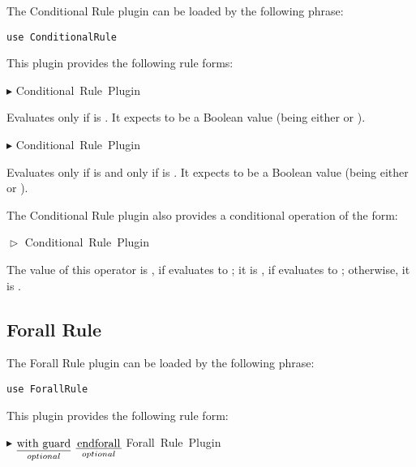 \documentclass{article}
\newcommand{\ruleform}[2]{\pform{$\blacktriangleright$}{#1}{#2}}
\newcommand{\opform}[2]{\pform{$\vartriangleright$}{#1}{#2}}
\newcommand{\pform}[3]{\vspace*{4mm} \noindent #1 #2 \vspace{1mm}\textcolor[gray]{0.7}{\dotfill}\mbox{{\sffamily \footnotesize #3}}}
\newcommand{\optional}[1]{$\underset{optional}{\underline{\mbox{#1}}}$}
\begin{document}
The Conditional Rule plugin can be loaded by the following  phrase:

\begin{lstlisting}
use ConditionalRule
\end{lstlisting}

\noindent This plugin provides the following rule forms:

\ruleform{
	}{Conditional Rule Plugin}

Evaluates  only if  is . It expects  to be a Boolean value (being either  or ).

\ruleform{
	}{Conditional Rule Plugin}

Evaluates  only if  is  and  only if  is . It expects  to be a Boolean value (being either  or ).

The Conditional Rule plugin also provides a conditional operation of the form:

\opform{
	}{Conditional Rule Plugin}

The value of this operator is , if  evaluates to ; it is ,
if  evaluates to ; otherwise, it is . 


\subsection{Forall Rule}
\label{forall}

The Forall Rule plugin can be loaded by the following  phrase:

\begin{lstlisting}
use ForallRule
\end{lstlisting}

\noindent This plugin provides the following rule form:

\ruleform{
		\optional{\asm{with guard}}
		\asm{do rule}
		\optional{\asm{endforall}}
	}{Forall Rule Plugin}
\end{document}
